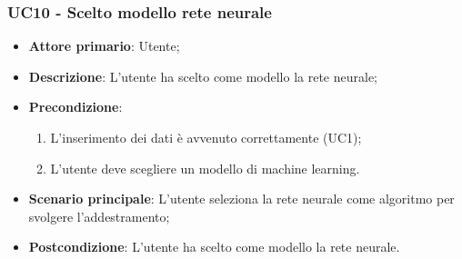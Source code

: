 \subsubsection{UC10 - Scelto modello rete neurale}
\label{sssec:uc10}
\begin{itemize}
  \item \textbf{Attore primario}: Utente;
  \item \textbf{Descrizione}: L'utente ha scelto come modello la rete neurale;
  \item \textbf{Precondizione}:
  \begin{enumerate}
    \item L'inserimento dei dati è avvenuto correttamente (UC1);
    \item L'utente deve scegliere un modello di machine learning.
  \end{enumerate}
  \item \textbf{Scenario principale}: L'utente seleziona la rete neurale come algoritmo per svolgere l'addestramento;
  \item \textbf{Postcondizione}: L'utente ha scelto come modello la rete neurale.
\end{itemize}
